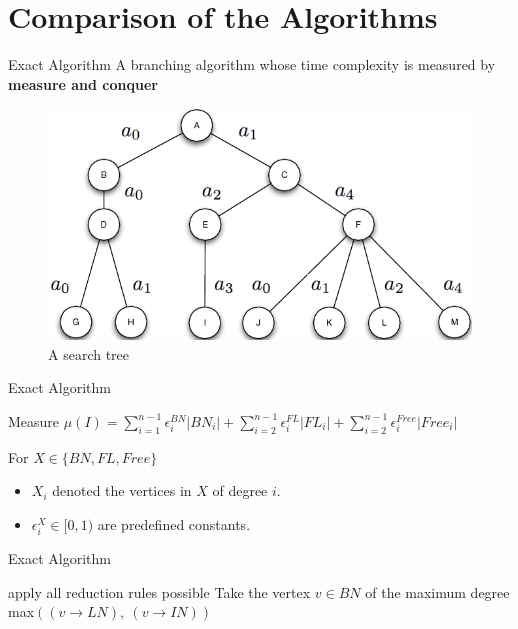 \documentclass{beamer}
\begin{document}
\section{Comparison of the Algorithms}

\begin{frame}{Exact Algorithm}
    A branching algorithm whose time complexity is measured by \textbf{measure and conquer}
    \pause
    \hspace{2 cm}
    \begin{figure}
        \centering
        \includegraphics[width=0.6\linewidth]{br.png}
        \caption{A search tree}
        \label{fig:my_label}
    \end{figure}
\end{frame}

\begin{frame}{Exact Algorithm}
    \begin{exampleblock}{Measure}
        $\mu(I) = \sum_{i=1}^{n-1} \epsilon_i^{BN}|BN_i| + \sum_{i=2}^{n-1} \epsilon_i^{FL}|FL_i| + \sum_{i=2}^{n-1} \epsilon_i^{Free}|Free_i|$
    \end{exampleblock}
    \hspace{1 cm}
    For $X \in \{BN, FL, Free\}$
    \begin{itemize}
        \item $X_i$ denoted the vertices in $X$ of degree $i$.
        \item $\epsilon_i^{X} \in [0,1)$ are predefined constants.
    \end{itemize} 
\end{frame}

\begin{frame}{Exact Algorithm}
\begin{algorithm}[H]
    apply all reduction rules possible\; 
    Take the vertex $v \in BN$ of the maximum degree\; 
    {\color{purple}
    {\Return max$((v \rightarrow LN),\ (v \rightarrow IN))$}
    }
\end{algorithm}
\end{frame}
\end{document}
